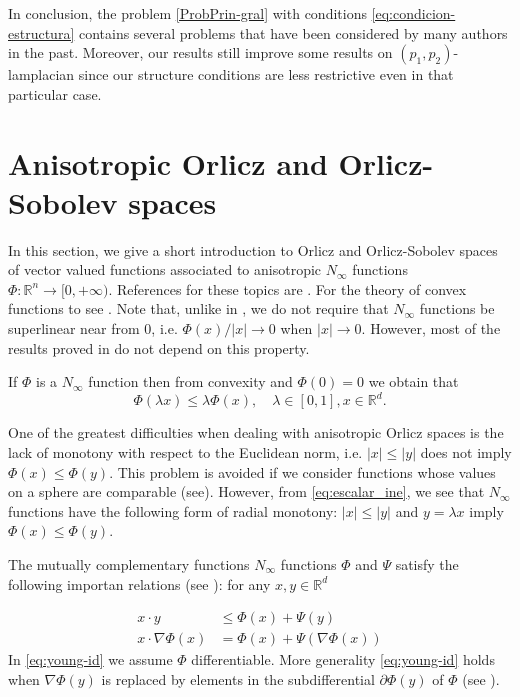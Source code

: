 \documentclass[twoside]{article}
\theoremstyle{remark}
\newcommand{\rr}{\mathbb{R}}
\renewcommand{\leq}{\leqslant}
\begin{document}
In conclusion, the problem \eqref{ProbPrin-gral} with conditions \eqref{eq:condicion-estructura}  contains several problems that have been considered by many authors in the past. 
Moreover, our results still improve some results on $(p_1,p_2)$-lamplacian since our structure conditions are less restrictive even in that particular case. 

\section{Anisotropic Orlicz and Orlicz-Sobolev spaces}\label{preliminares}

In this section, we give a short introduction to  Orlicz and Orlicz-Sobolev spaces of vector valued functions associated to anisotropic $N_{\infty}$ functions $\Phi:\rr^n\to[0,+\infty)$.  References for  these topics are \cite{Desch2001,Orliczvectorial2005,Skaff1969,cianchi2000fully,cianchi2004optimal,chamra2017anisotropic,trudinger1974imbedding,gwiazda2013anisotropic}. For the theory of convex functions to see \cite{clarke2013functional}. 
Note that, unlike in \cite{gwiazda2013anisotropic}, we do not require that $N_{\infty}$ functions be superlinear near from 0, i.e. $\Phi(x)/|x|\to 0$ when $|x|\to 0$. However, most of the results proved in \cite{gwiazda2013anisotropic} do not depend on this property.

If $\Phi$  is a $N_{\infty}$ function then from convexity and $\Phi(0)=0$ we obtain that
\begin{equation}\label{eq:escalar_ine}
 \Phi(\lambda x)\leq \lambda\Phi(x),\quad \lambda\in[0,1],x\in\rr^d.
\end{equation}

One of the greatest difficulties when dealing with anisotropic Orlicz spaces is the lack of  monotony  with respect to the Euclidean norm, i.e. $|x|\leq |y|$ does not imply $\Phi(x)\leq\Phi(y)$. This problem is avoided if we consider functions whose values on a sphere are comparable (see\cite{Skaff1969}). However, from \eqref{eq:escalar_ine}, we see that  $N_{\infty}$ functions have the following form of radial monotony: $|x|\leq |y|$ and $y=\lambda x$ imply $\Phi(x)\leq\Phi(y)$. 

The mutually complementary functions $N_{\infty}$ functions $\Phi$ and $\Psi$ satisfy the following importan relations (see \cite{clarke2013functional}): for any $x,y\in\rr^d$

\begin{align}
  x\cdot y&\leq \Phi(x)+\Psi(y)\tag{Fenchel's Inequality}\label{eq:young-ine}\\
  x\cdot \nabla\Phi(x)&= \Phi(x)+\Psi(\nabla \Phi (x))\tag{Fenchel's Identity}\label{eq:young-id}
\end{align}
In \eqref{eq:young-id} we assume $\Phi$ differentiable. More generality \eqref{eq:young-id} holds when $\nabla \Phi (y)$ is replaced by elements in the subdifferential $\partial\Phi(y)$ of $\Phi$ (see \cite[Ex. 4.27]{clarke2013functional}).
\end{document}
